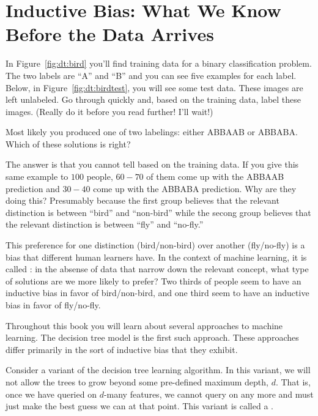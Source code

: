 \section{Inductive Bias: What We Know Before the Data Arrives}



In Figure~\ref{fig:dt:bird} you'll find training data for a binary
classification problem.  The two labels are ``A'' and ``B'' and you
can see five examples for each label.  Below, in
Figure~\ref{fig:dt:birdtest}, you will see some test data.  These
images are left unlabeled.  Go through quickly and, based on the
training data, label these images.  (Really do it before you read
further!  I'll wait!)

Most likely you produced one of two labelings: either ABBAAB or
ABBABA.  Which of these solutions is right?

The answer is that you cannot tell based on the training data.  If you
give this same example to $100$ people, $60-70$ of them come up with
the ABBAAB prediction and $30-40$ come up with the ABBABA prediction.
Why are they doing this?  Presumably because the first group believes
that the relevant distinction is between ``bird'' and ``non-bird''
while the secong group believes that the relevant distinction is
between ``fly'' and ``no-fly.''

This preference for one distinction (bird/non-bird) over another
(fly/no-fly) is a bias that different human learners have.  In the
context of machine learning, it is called : in
the absense of data that narrow down the relevant concept, what type
of solutions are we more likely to prefer?  Two thirds of people seem
to have an inductive bias in favor of bird/non-bird, and one third
seem to have an inductive bias in favor of fly/no-fly.


Throughout this book you will learn about several approaches to
machine learning.  The decision tree model is the first such
approach.  These approaches differ primarily in the sort of inductive
bias that they exhibit.

Consider a variant of the decision tree learning algorithm.  In this
variant, we will not allow the trees to grow beyond some pre-defined
maximum depth, $d$.  That is, once we have queried on $d$-many
features, we cannot query on any more and must just make the best
guess we can at that point.  This variant is called a .

